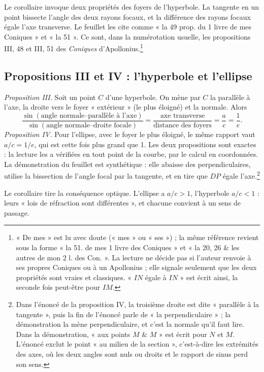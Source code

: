 \documentclass[11pt,a4paper]{article}
\begin{document}
Le corollaire invoque deux propriétés des foyers de l'hyperbole. La tangente en
un point bissecte l'angle des deux rayons focaux, et la différence des rayons
focaux égale l'axe transverse. Le feuillet les cite comme « la 49 prop. du 1
livre de mes Coniques » et « la 51 ». Ce sont, dans la numérotation usuelle,
les propositions III, 48 et III, 51 des \emph{Coniques}
d'Apollonius.\footnote{« De mes » est lu avec doute (« mes » ou « ses ») ; la
même référence revient sous la forme « la 51. de mes 1 livre des Coniques » et
« la 20, 26 \& les autres de mon 2 l. des Con. ». La lecture ne décide pas si
l'auteur renvoie à ses propres Coniques ou à un Apollonius ; elle signale
seulement que les deux propriétés sont vraies et classiques. « \(IN\) égale à
\(IN\) » est écrit ainsi, la seconde fois peut-être pour \(IM\).}

\subsection*{Propositions III et IV : l'hyperbole et l'ellipse}

\emph{Proposition III.} Soit un point \(C\) d'une hyperbole. On mène par \(C\) la
parallèle à l'axe, la droite vers le foyer « extérieur » (le plus éloigné) et
la normale. Alors
\[
\frac{\sin(\text{angle normale–parallèle à l'axe})}{\sin(\text{angle normale–droite focale})}=\frac{\text{axe transverse}}{\text{distance des foyers}}=\frac{a}{c}=\frac1e .
\]
\emph{Proposition IV.} Pour l'ellipse, avec le foyer le plus éloigné, le même
rapport vaut \(a/c=1/e\), qui est cette fois plus grand que 1. Les deux
propositions sont exactes : la lecture les a vérifiées en tout point de la
courbe, par le calcul en coordonnées. La démonstration du feuillet est
synthétique : elle abaisse des perpendiculaires, utilise la bissection de
l'angle focal par la tangente, et en tire que \(DP\) égale l'axe.\footnote{Dans
l'énoncé de la proposition IV, la troisième droite est dite « parallèle à la
tangente », puis la fin de l'énoncé parle de « la perpendiculaire » ; la
démonstration la mène perpendiculaire, et c'est la normale qu'il faut lire.
Dans la démonstration, « aux points \(M\) \& \(M\) » est écrit pour \(N\) et
\(M\). L'énoncé exclut le point « au milieu de la section », c'est-à-dire les
extrémités des axes, où les deux angles sont nuls ou droits et le rapport de
sinus perd son sens.}

Le corollaire tire la conséquence optique. L'ellipse a \(a/c>1\), l'hyperbole
\(a/c<1\) : leurs « lois de réfraction sont différentes », et chacune convient à
un sens de passage.
\end{document}
